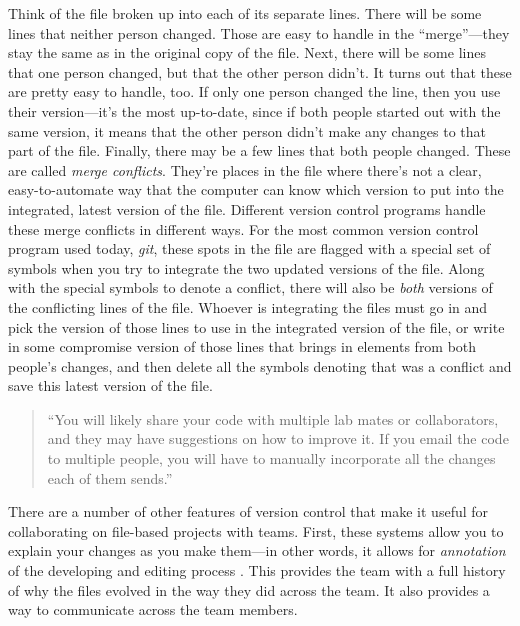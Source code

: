 \documentclass[]{tufte-book}
\begin{document}
Think of the file broken up into each of its separate lines. There will be some
lines that neither person changed. Those are easy to handle in the
``merge''---they stay the same as in the original copy of the file. Next, there
will be some lines that one person changed, but that the other person didn't. It
turns out that these are pretty easy to handle, too. If only one person changed
the line, then you use their version---it's the most up-to-date, since if both
people started out with the same version, it means that the other person didn't
make any changes to that part of the file. Finally, there may be a few lines
that both people changed. These are called \emph{merge conflicts}. They're places in
the file where there's not a clear, easy-to-automate way that the computer can
know which version to put into the integrated, latest version of the file.
Different version control programs handle these merge conflicts in different
ways. For the most common version control program used today, \emph{git}, these spots
in the file are flagged with a special set of symbols when you try to integrate
the two updated versions of the file. Along with the special symbols to denote a
conflict, there will also be \emph{both} versions of the conflicting lines of the
file. Whoever is integrating the files must go in and pick the version of those
lines to use in the integrated version of the file, or write in some compromise
version of those lines that brings in elements from both people's changes, and
then delete all the symbols denoting that was a conflict and save this latest
version of the file.

\begin{quote}
``You will likely share your code with multiple lab mates or collaborators,
and they may have suggestions on how to improve it. If you email the code
to multiple people, you will have to manually incorporate all the changes
each of them sends.'' \citep{blischak2016quick}
\end{quote}

There are a number of other features of version control that make it useful for
collaborating on file-based projects with teams. First, these systems allow you
to explain your changes as you make them---in other words, it allows for
\emph{annotation} of the developing and editing process \citep{raymondunderstanding}. This
provides the team with a full history of why the files evolved in the way they
did across the team. It also provides a way to communicate across the team
members.
\end{document}
